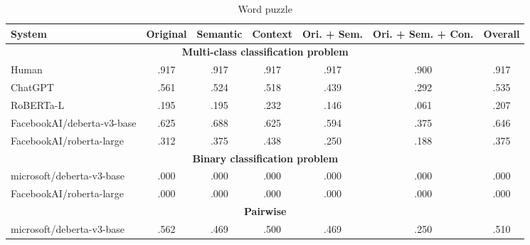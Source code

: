 \begin{table*}
	\caption{Word puzzle}
	\label{tab:word-results-table}
	\begin{center}
		\begin{tabular}{lcccccc}
			\toprule
			\textbf{System}           & \textbf{Original} & \textbf{Semantic} & \textbf{Context} & \textbf{Ori. + Sem.} & \textbf{Ori. + Sem. + Con.} & \textbf{Overall} \\
			\midrule
			\multicolumn{7}{c}{\textbf{Multi-class classification problem}}                                                                                              \\
			\midrule
			\color{gray}Human         & \color{gray}.917  & \color{gray}.917  & \color{gray}.917 & \color{gray}.917     & \color{gray}.900            & \color{gray}.917 \\
			\color{gray}ChatGPT       & \color{gray}.561  & \color{gray}.524  & \color{gray}.518 & \color{gray}.439     & \color{gray}.292            & \color{gray}.535 \\
			\color{gray}RoBERTa-L     & \color{gray}.195  & \color{gray}.195  & \color{gray}.232 & \color{gray}.146     & \color{gray}.061            & \color{gray}.207 \\
			\midrule
			FacebookAI/deberta-v3-base           & .625              & .688              & .625             & .594                 & .375                        & .646             \\
			FacebookAI/roberta-large  & .312              & .375              & .438             & .250                 & .188                        & .375             \\
			\midrule
			\multicolumn{7}{c}{\textbf{Binary classification problem}}                                                                                                   \\
			\midrule
			microsoft/deberta-v3-base & .000              & .000              & .000             & .000                 & .000                        & .000             \\
			FacebookAI/roberta-large  & .000              & .000              & .000             & .000                 & .000                        & .000             \\
			\midrule
			\multicolumn{7}{c}{\textbf{Pairwise}}                                                                                                                        \\
			\midrule
			microsoft/deberta-v3-base & .562              & .469              & .500             & .469                 & .250                        & .510             \\
			\bottomrule
		\end{tabular}
	\end{center}
\end{table*}
